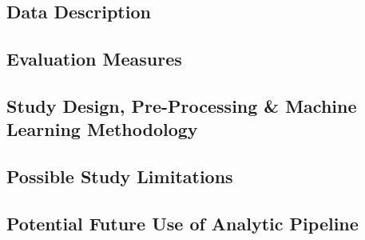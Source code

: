 \documentclass[twoside,11pt]{article}
\begin{document}
\subsection{Data Description}


\subsection{Evaluation Measures}

\subsection{Study Design, Pre-Processing & Machine Learning Methodology}


\subsection{Possible Study Limitations}

\subsection{Potential Future Use of Analytic Pipeline}


\end{document}
